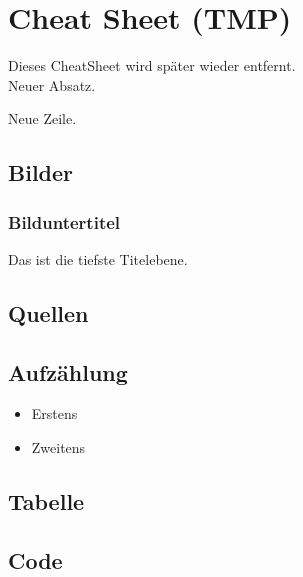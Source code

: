 \section{Cheat Sheet (TMP)}
Dieses CheatSheet wird später wieder entfernt. \\

Neuer Absatz.

Neue Zeile.

\subsection{Bilder}

\subsubsection{Bilduntertitel}
Das ist die tiefste Titelebene.

\subsection{Quellen}

\subsection{Aufzählung}
\begin{itemize}
    \item Erstens
    \item Zweitens
\end{itemize}

\subsection{Tabelle}

\subsection{Code}
